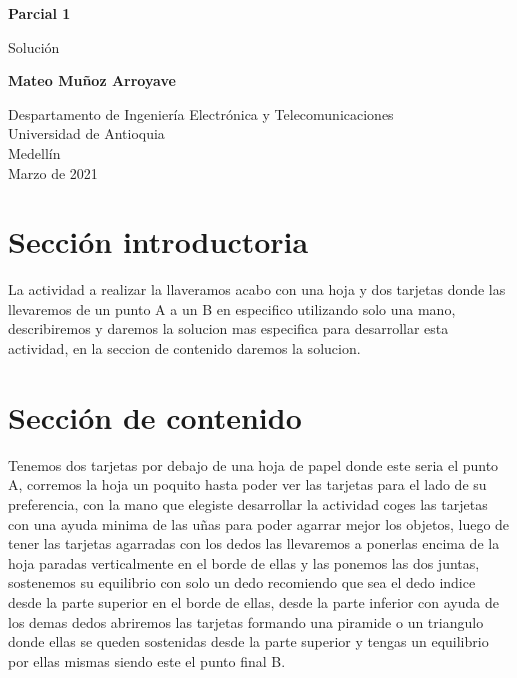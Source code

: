 \documentclass{article}
\begin{document}
\begin{titlepage}
    \begin{center}
        \vspace*{1cm}
            
        \Huge
        \textbf{Parcial 1}
            
        \vspace{0.5cm}
        \LARGE
        Solución
            
        \vspace{1.5cm}
            
        \textbf{Mateo Muñoz Arroyave}
            
        \vfill
            
        \vspace{0.8cm}
            
        \Large
        Despartamento de Ingeniería Electrónica y Telecomunicaciones\\
        Universidad de Antioquia\\
        Medellín\\
        Marzo de 2021
            
    \end{center}
\end{titlepage}

\tableofcontents

\section{Sección introductoria}\label{intro}
La actividad a realizar la llaveramos acabo con una hoja y dos tarjetas donde las llevaremos de un punto A a un B en especifico utilizando solo una mano, describiremos y daremos la solucion mas especifica para desarrollar esta actividad, en la seccion de contenido daremos la solucion. 

\section{Sección de contenido} \label{contenido}
Tenemos dos tarjetas por debajo de una hoja de papel donde este seria el punto A, corremos la hoja un poquito hasta poder ver las tarjetas para el lado de su preferencia, con la mano que elegiste desarrollar la actividad coges las tarjetas con una ayuda minima de las uñas para poder agarrar mejor los objetos, luego de tener las tarjetas agarradas con los dedos las llevaremos a ponerlas encima de la hoja paradas verticalmente en el borde de ellas y las ponemos las dos juntas, sostenemos su equilibrio con solo un dedo recomiendo que sea el dedo indice desde la parte superior en el borde de ellas, desde la parte inferior con ayuda de los demas dedos abriremos las tarjetas formando una piramide o un triangulo donde ellas se queden sostenidas desde la parte superior y tengas un equilibrio por ellas mismas siendo este el punto final B.
\end{document}
